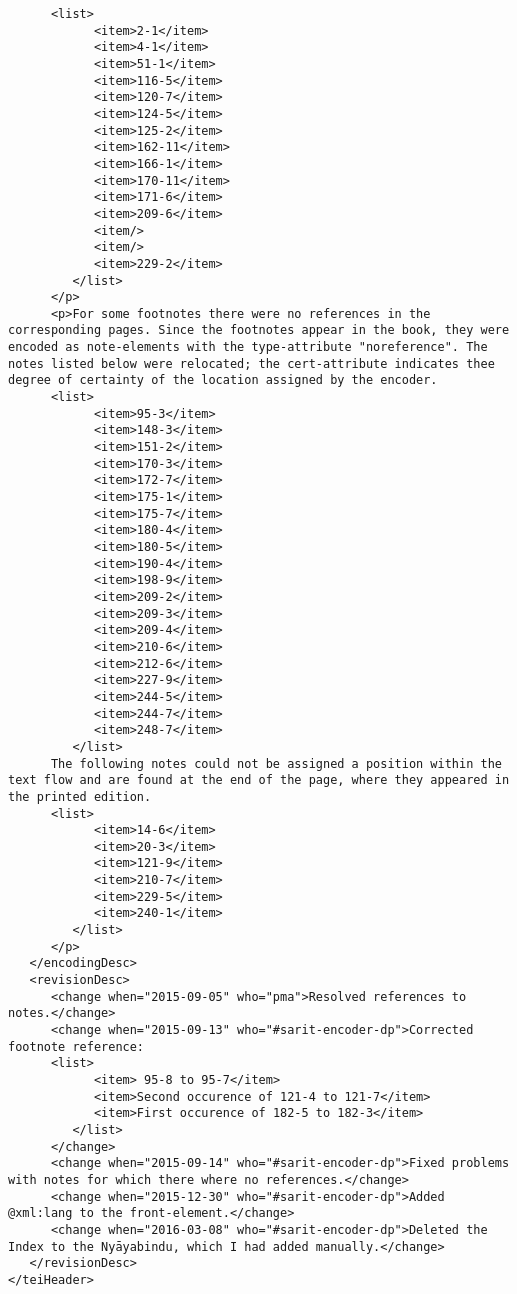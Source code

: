 \documentclass[article,12pt,a4paper]{memoir}
\begin{document}
\begin{verbatim}
      <list>
            <item>2-1</item>
            <item>4-1</item>
            <item>51-1</item>
            <item>116-5</item>
            <item>120-7</item>
            <item>124-5</item>
            <item>125-2</item>
            <item>162-11</item>
            <item>166-1</item>
            <item>170-11</item>
            <item>171-6</item>
            <item>209-6</item>
            <item/>
            <item/>
            <item>229-2</item>
         </list>
      </p>
      <p>For some footnotes there were no references in the corresponding pages. Since the footnotes appear in the book, they were encoded as note-elements with the type-attribute "noreference". The notes listed below were relocated; the cert-attribute indicates thee degree of certainty of the location assigned by the encoder.
      <list>
            <item>95-3</item>
            <item>148-3</item>
            <item>151-2</item>
            <item>170-3</item>
            <item>172-7</item>
            <item>175-1</item>
            <item>175-7</item>
            <item>180-4</item>
            <item>180-5</item>
            <item>190-4</item>
            <item>198-9</item>
            <item>209-2</item>
            <item>209-3</item>
            <item>209-4</item>
            <item>210-6</item>
            <item>212-6</item>
            <item>227-9</item>
            <item>244-5</item>
            <item>244-7</item>
            <item>248-7</item>
         </list>
      The following notes could not be assigned a position within the text flow and are found at the end of the page, where they appeared in the printed edition.
      <list>
            <item>14-6</item>
            <item>20-3</item>
            <item>121-9</item>
            <item>210-7</item>
            <item>229-5</item>
            <item>240-1</item>
         </list>
      </p>
   </encodingDesc>
   <revisionDesc>
      <change when="2015-09-05" who="pma">Resolved references to notes.</change>
      <change when="2015-09-13" who="#sarit-encoder-dp">Corrected footnote reference:
      <list>
            <item> 95-8 to 95-7</item>
            <item>Second occurence of 121-4 to 121-7</item>
            <item>First occurence of 182-5 to 182-3</item>
         </list>
      </change>
      <change when="2015-09-14" who="#sarit-encoder-dp">Fixed problems with notes for which there where no references.</change>
      <change when="2015-12-30" who="#sarit-encoder-dp">Added @xml:lang to the front-element.</change>
      <change when="2016-03-08" who="#sarit-encoder-dp">Deleted the Index to the Nyāyabindu, which I had added manually.</change>
   </revisionDesc>
</teiHeader>
	 \end{verbatim}
       
      \clearpage
      \begin{english}
      \printshorthands
      \printbibliography
      \end{english}
    
\end{document}
